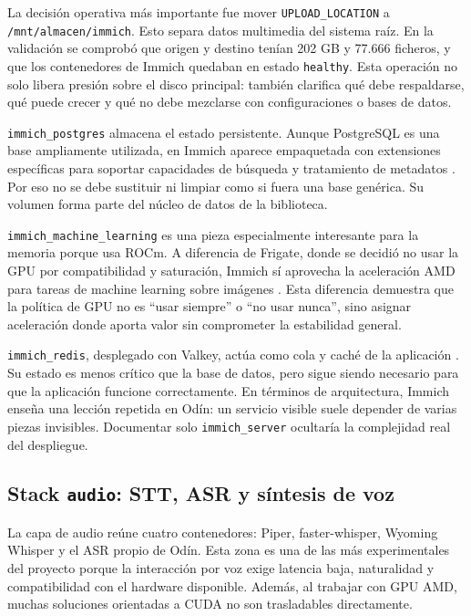 La decisión operativa más importante fue mover \texttt{UPLOAD\_LOCATION} a \nolinkurl{/mnt/almacen/immich}. Esto separa datos multimedia del sistema raíz. En la validación se comprobó que origen y destino tenían 202 GB y 77.666 ficheros, y que los contenedores de Immich quedaban en estado \texttt{healthy}. Esta operación no solo libera presión sobre el disco principal: también clarifica qué debe respaldarse, qué puede crecer y qué no debe mezclarse con configuraciones o bases de datos.

\texttt{immich\_postgres} almacena el estado persistente. Aunque PostgreSQL es una base ampliamente utilizada, en Immich aparece empaquetada con extensiones específicas para soportar capacidades de búsqueda y tratamiento de metadatos \citep{postgres15Docs,immichDockerInstall}. Por eso no se debe sustituir ni limpiar como si fuera una base genérica. Su volumen forma parte del núcleo de datos de la biblioteca.

\texttt{immich\_machine\_learning} es una pieza especialmente interesante para la memoria porque usa ROCm. A diferencia de Frigate, donde se decidió no usar la GPU por compatibilidad y saturación, Immich sí aprovecha la aceleración AMD para tareas de machine learning sobre imágenes \citep{immichRequirements,rocmDocs}. Esta diferencia demuestra que la política de GPU no es ``usar siempre'' o ``no usar nunca'', sino asignar aceleración donde aporta valor sin comprometer la estabilidad general.

\texttt{immich\_redis}, desplegado con Valkey, actúa como cola y caché de la aplicación \citep{valkeyDocs}. Su estado es menos crítico que la base de datos, pero sigue siendo necesario para que la aplicación funcione correctamente. En términos de arquitectura, Immich enseña una lección repetida en Odín: un servicio visible suele depender de varias piezas invisibles. Documentar solo \texttt{immich\_server} ocultaría la complejidad real del despliegue.

\subsection{Stack \texttt{audio}: STT, ASR y síntesis de voz}
La capa de audio reúne cuatro contenedores: Piper, faster-whisper, Wyoming Whisper y el ASR propio de Odín. Esta zona es una de las más experimentales del proyecto porque la interacción por voz exige latencia baja, naturalidad y compatibilidad con el hardware disponible. Además, al trabajar con GPU AMD, muchas soluciones orientadas a CUDA no son trasladables directamente.

